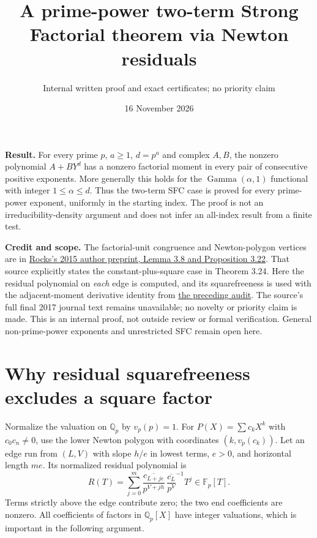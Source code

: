 \documentclass[11pt]{article}
\title{A prime-power two-term Strong Factorial theorem via Newton residuals}
\author{Internal written proof and exact certificates; no priority claim}
\date{16 November 2026}
\newcommand{\Q}{\mathbb Q}
\newcommand{\F}{\mathbb F}
\newcommand{\vp}{v_p}
\begin{document}
\maketitle
\noindent\textbf{Result.}
For every prime $p$, $a\ge1$, $d=p^a$ and complex $A,B$, the nonzero
polynomial $A+BY^d$ has a nonzero factorial moment in every pair of
consecutive positive exponents. More generally this holds for the
$\operatorname{Gamma}(\alpha,1)$ functional with integer $1\le\alpha\le d$.
Thus the two-term SFC case is proved for every prime-power exponent,
uniformly in the starting index. The proof is not an irreducibility-density
argument and does not infer an all-index result from a finite test.

\textbf{Credit and scope.}
The factorial-unit congruence and Newton-polygon vertices are in
\href{sources/rocks-2015-author-preprint.pdf}{Rocks's 2015 author preprint,
Lemma 3.8 and Proposition 3.22}. That source explicitly states the
constant-plus-square case in Theorem 3.24. Here the residual polynomial
on \emph{each} edge is computed, and its squarefreeness is used with the
adjacent-moment derivative identity from
\href{SFC_WINDOWS_AND_ROCKS_AUDIT.tex}{the preceding audit}.
The source's full final 2017 journal text remains unavailable; no novelty
or priority claim is made. This is an internal proof, not outside review
or formal verification. General non-prime-power exponents and unrestricted
SFC remain open here.

\section{Why residual squarefreeness excludes a square factor}
Normalize the valuation on $\Q_p$ by $\vp(p)=1$.
For $P(X)=\sum c_kX^k$ with $c_0c_n\ne0$, use the lower Newton polygon
with coordinates $(k,\vp(c_k))$. Let an edge run from $(L,V)$ with slope
$h/e$ in lowest terms, $e>0$, and horizontal length $me$.
Its normalized residual polynomial is
\[
 R(T)=\sum_{j=0}^{m}
 \overline{\frac{c_{L+je}}{p^{V+jh}}}\,
 \overline{\frac{c_L}{p^V}}^{-1}T^j\in\F_p[T].       \tag{1}
\]
Terms strictly above the edge contribute zero; the two end coefficients
are nonzero. All coefficients of factors in $\Q_p[X]$ have integer
valuations, which is important in the following argument.
\end{document}
